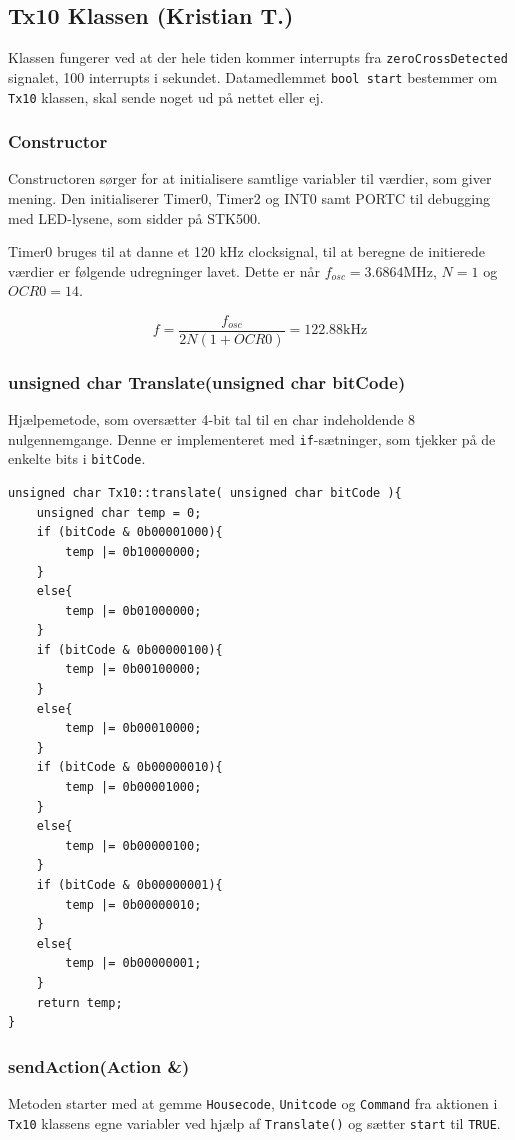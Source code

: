 \subsection{Tx10 Klassen (Kristian T.)}

Klassen fungerer ved at der hele tiden kommer interrupts fra \texttt{zeroCrossDetected} signalet, 100 interrupts i sekundet. Datamedlemmet \texttt{bool start} bestemmer om \texttt{Tx10} klassen, skal sende noget ud på nettet eller ej.

\subsubsection{Constructor}
Constructoren sørger for at initialisere samtlige variabler til værdier, som giver mening. Den initialiserer Timer0, Timer2 og INT0 samt PORTC til debugging med LED-lysene, som sidder på STK500.

Timer0 bruges til at danne et 120 kHz clocksignal, til at beregne de initierede værdier er følgende udregninger lavet. Dette er når $f_{osc} = 3.6864 \text{MHz}$, $N = 1$ og $OCR0 = 14$. 

\begin{displaymath}
f = \frac{f_{osc}}{2 N (1 + OCR0)} = 122.88 \text{kHz}
\end{displaymath}

\subsubsection{unsigned char Translate(unsigned char bitCode)}

Hjælpemetode, som oversætter 4-bit tal til en char indeholdende 8 nulgennemgange. Denne er implementeret med \texttt{if}-sætninger, som tjekker på de enkelte bits i \texttt{bitCode}.

\begin{lstlisting}
unsigned char Tx10::translate( unsigned char bitCode ){
	unsigned char temp = 0;
	if (bitCode & 0b00001000){
		temp |= 0b10000000;
	}
	else{
		temp |= 0b01000000;
	}
	if (bitCode & 0b00000100){
		temp |= 0b00100000;
	}
	else{
		temp |= 0b00010000;
	}
	if (bitCode & 0b00000010){
		temp |= 0b00001000;
	}
	else{
		temp |= 0b00000100;
	}
	if (bitCode & 0b00000001){
		temp |= 0b00000010;
	}
	else{
		temp |= 0b00000001;
	}
	return temp;
}
\end{lstlisting}

\subsubsection{sendAction(Action \&)}
Metoden starter med at gemme \texttt{Housecode}, \texttt{Unitcode} og \texttt{Command} fra aktionen i \texttt{Tx10} klassens egne variabler ved hjælp af \texttt{Translate()} og sætter \texttt{start} til \texttt{TRUE}.

